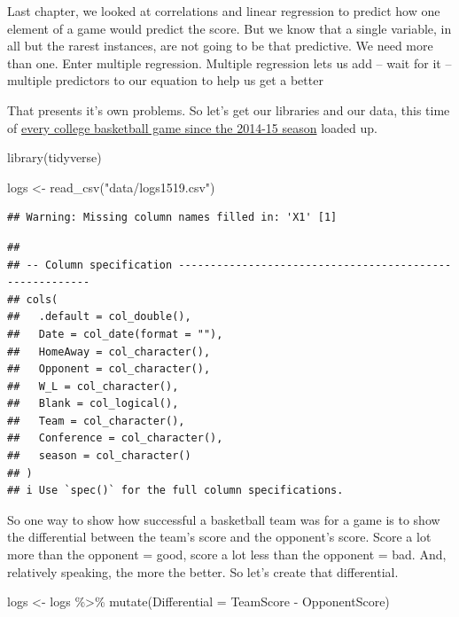 \documentclass[
]{book}
\newenvironment{Shaded}{\begin{snugshade}}{\end{snugshade}}
\newcommand{\AttributeTok}[1]{\textcolor[rgb]{0.77,0.63,0.00}{#1}}
\newcommand{\FunctionTok}[1]{\textcolor[rgb]{0.00,0.00,0.00}{#1}}
\newcommand{\NormalTok}[1]{#1}
\newcommand{\OtherTok}[1]{\textcolor[rgb]{0.56,0.35,0.01}{#1}}
\newcommand{\SpecialCharTok}[1]{\textcolor[rgb]{0.00,0.00,0.00}{#1}}
\newcommand{\StringTok}[1]{\textcolor[rgb]{0.31,0.60,0.02}{#1}}
\begin{document}
Last chapter, we looked at correlations and linear regression to predict how one element of a game would predict the score. But we know that a single variable, in all but the rarest instances, are not going to be that predictive. We need more than one. Enter multiple regression. Multiple regression lets us add -- wait for it -- multiple predictors to our equation to help us get a better

That presents it's own problems. So let's get our libraries and our data, this time of \href{https://unl.box.com/s/u9407jj007fxtnu1vbkybdawaqg6j3fw}{every college basketball game since the 2014-15 season} loaded up.

\begin{Shaded}
\begin{Highlighting}[]
\FunctionTok{library}\NormalTok{(tidyverse)}
\end{Highlighting}
\end{Shaded}

\begin{Shaded}
\begin{Highlighting}[]
\NormalTok{logs }\OtherTok{\textless{}{-}} \FunctionTok{read\_csv}\NormalTok{(}\StringTok{"data/logs1519.csv"}\NormalTok{)}
\end{Highlighting}
\end{Shaded}

\begin{verbatim}
## Warning: Missing column names filled in: 'X1' [1]
\end{verbatim}

\begin{verbatim}
## 
## -- Column specification --------------------------------------------------------
## cols(
##   .default = col_double(),
##   Date = col_date(format = ""),
##   HomeAway = col_character(),
##   Opponent = col_character(),
##   W_L = col_character(),
##   Blank = col_logical(),
##   Team = col_character(),
##   Conference = col_character(),
##   season = col_character()
## )
## i Use `spec()` for the full column specifications.
\end{verbatim}

So one way to show how successful a basketball team was for a game is to show the differential between the team's score and the opponent's score. Score a lot more than the opponent = good, score a lot less than the opponent = bad. And, relatively speaking, the more the better. So let's create that differential.

\begin{Shaded}
\begin{Highlighting}[]
\NormalTok{logs }\OtherTok{\textless{}{-}}\NormalTok{ logs }\SpecialCharTok{\%\textgreater{}\%} \FunctionTok{mutate}\NormalTok{(}\AttributeTok{Differential =}\NormalTok{ TeamScore }\SpecialCharTok{{-}}\NormalTok{ OpponentScore)}
\end{Highlighting}
\end{Shaded}
\end{document}
